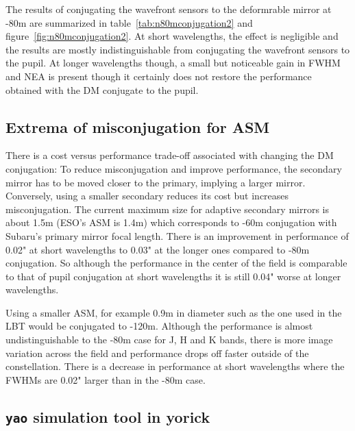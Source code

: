 \documentclass[aas_macros,10pt]{article}
\begin{document}
The results of conjugating the wavefront sensors to the deformrable mirror at -80m are summarized in table~\ref{tab:n80mconjugation2} and figure~\ref{fig:n80mconjugation2}. At short wavelengths, the effect is negligible and the results are mostly indistinguishable from conjugating the wavefront sensors to the pupil. At longer wavelengths though, a small but noticeable gain in FWHM and NEA is present though it certainly does not restore the performance obtained with the DM conjugate to the pupil.

\subsection{Extrema of misconjugation for ASM}

There is a cost versus performance trade-off associated with changing the DM conjugation: To reduce misconjugation and improve performance, the secondary mirror has to be moved closer to the primary, implying a larger mirror. Conversely, using a smaller secondary reduces its cost but increases misconjugation. The current maximum size for adaptive secondary mirrors is about 1.5m (ESO's ASM is 1.4m) which corresponds to -60m conjugation with Subaru's primary mirror focal length. There is an improvement in performance of 0.02" at short wavelengths to 0.03" at the longer ones compared to -80m conjugation. So although the performance in the center of the field is comparable to that of pupil conjugation at short wavelengths it is still 0.04" worse at longer wavelengths.

Using a smaller ASM, for example 0.9m in diameter such as the one used in the LBT would be conjugated to -120m. Although the performance is almost undistinguishable to the -80m case for J, H and K bands, there is more image variation across the field and performance drops off faster outside of the constellation. There is a decrease in performance  at short wavelengths where the FWHMs are 0.02" larger than in the -80m case.

\subsection{\texttt{yao} simulation tool in yorick}
\end{document}
